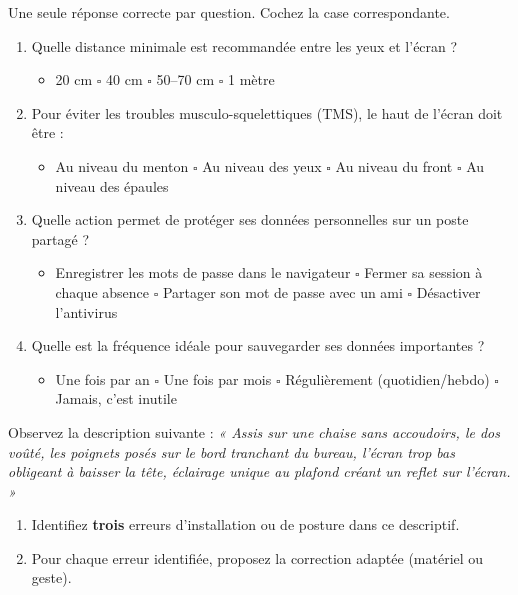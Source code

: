 \documentclass[11pt]{article}
\begin{document}
\begin{exercice}
Une seule réponse correcte par question. Cochez la case correspondante.
\begin{enumerate}
    \item Quelle distance minimale est recommandée entre les yeux et l'écran ?
    \begin{itemize}
        \item[$\square$] 20 cm \quad $\square$ 40 cm \quad $\square$ 50--70 cm \quad $\square$ 1 mètre
    \end{itemize}
    \item Pour éviter les troubles musculo-squelettiques (TMS), le haut de l'écran doit être :
    \begin{itemize}
        \item[$\square$] Au niveau du menton \quad $\square$ Au niveau des yeux \quad $\square$ Au niveau du front \quad $\square$ Au niveau des épaules
    \end{itemize}
    \item Quelle action permet de protéger ses données personnelles sur un poste partagé ?
    \begin{itemize}
        \item[$\square$] Enregistrer les mots de passe dans le navigateur \quad $\square$ Fermer sa session à chaque absence \quad $\square$ Partager son mot de passe avec un ami \quad $\square$ Désactiver l'antivirus
    \end{itemize}
    \item Quelle est la fréquence idéale pour sauvegarder ses données importantes ?
    \begin{itemize}
        \item[$\square$] Une fois par an \quad $\square$ Une fois par mois \quad $\square$ Régulièrement (quotidien/hebdo) \quad $\square$ Jamais, c'est inutile
    \end{itemize}
\end{enumerate}
\end{exercice}

\begin{exercice}
Observez la description suivante : \textit{« Assis sur une chaise sans accoudoirs, le dos voûté, les poignets posés sur le bord tranchant du bureau, l'écran trop bas obligeant à baisser la tête, éclairage unique au plafond créant un reflet sur l'écran. »}
\begin{enumerate}
    \item Identifiez \textbf{trois} erreurs d'installation ou de posture dans ce descriptif.
    \item Pour chaque erreur identifiée, proposez la correction adaptée (matériel ou geste).
\end{enumerate}
\end{exercice}
\end{document}
